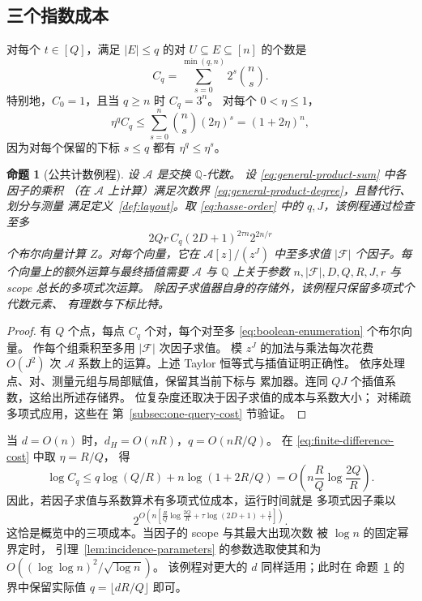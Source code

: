 \documentclass[11pt,reqno]{amsart}
\numberwithin{equation}{section}
\newtheorem{proposition}[theorem]{命题}
\theoremstyle{definition}\newtheorem{definition}[theorem]{定义}
\theoremstyle{remark}\newtheorem{remark}[theorem]{注}
\renewcommand{\le}{\leqslant}
\renewcommand{\ge}{\geqslant}
\begin{document}
\subsection{三个指数成本}
\label{subsec:three-costs}
对每个 $t\in[Q]$，满足 $|E|\le q$ 的对
$U\subseteq E\subseteq[n]$ 的个数是
\begin{equation}\label{eq:pair-count}
 C_q=\sum_{s=0}^{\min(q,n)}2^s\binom ns.
\end{equation}
特别地，$C_0=1$，且当 $q\ge n$ 时 $C_q=3^n$。
对每个 $0<\eta\le1$，
\begin{equation}\label{eq:finite-difference-cost}
 \eta^qC_q\le\sum_{s=0}^n\binom ns(2\eta)^s=(1+2\eta)^n,
\end{equation}
因为对每个保留的下标 $s\le q$ 都有
$\eta^q\le\eta^s$。

\begin{proposition}[公共计数例程]\label{prop:general-count}
设 $\mathcal A$ 是交换 $\mathbb Q$-代数。
设 \eqref{eq:general-product-sum} 中各因子的乘积
（在 $\mathcal A$ 上计算）满足次数界
\eqref{eq:general-product-degree}，且替代行、划分与测量
满足定义~\ref{def:layout}。取 \eqref{eq:hasse-order}
中的 $q,J$，该例程通过检查至多
\[
 2Qr\,C_q(2D+1)^{2\tau n}2^{2n/r}
\]
个布尔向量计算 $Z$。对每个向量，它在
$\mathcal A[z]/(z^J)$ 中至多求值 $|\mathcal F|$
个因子。每个向量上的额外运算与最终插值需要
$\mathcal A$ 与 $\mathbb Q$ 上关于参数
$n,|\mathcal F|,D,Q,R,J,r$ 与 scope 总长的多项式次运算。
除因子求值器自身的存储外，该例程只保留多项式个代数元素、
有理数与下标比特。
\end{proposition}
\begin{proof}
有 $Q$ 个点，每点 $C_q$ 个对，每个对至多
\eqref{eq:boolean-enumeration} 个布尔向量。
作每个组乘积至多用 $|\mathcal F|$ 次因子求值。
模 $z^J$ 的加法与乘法每次花费 $O(J^2)$ 次 $\mathcal A$
系数上的运算。上述 Taylor 恒等式与插值证明正确性。
依序处理点、对、测量元组与局部赋值，保留其当前下标与
累加器。连同 $QJ$ 个插值系数，这给出所述存储界。
位复杂度还取决于因子求值的成本与系数大小；
对稀疏多项式应用，这些在
第~\ref{subsec:one-query-cost} 节验证。
\end{proof}

当 $d=O(n)$ 时，$d_H=O(nR)$，$q=O(nR/Q)$。
在 \eqref{eq:finite-difference-cost} 中取 $\eta=R/Q$，
得
\[
 \log C_q\le q\log(Q/R)+n\log(1+2R/Q)
     =O\!\left(n\frac RQ\log\frac{2Q}{R}\right).
\]
因此，若因子求值与系数算术有多项式位成本，运行时间就是
多项式因子乘以
\begin{equation}\label{eq:three-costs}
 2^{O\left(n\left[
       \frac RQ\log\frac{2Q}{R}
       +\tau\log(2D+1)+\frac1r\right]\right)}.
\end{equation}
这恰是概览中的三项成本。当因子的 scope 与其最大出现次数
被 $\log n$ 的固定幂界定时，
引理~\ref{lem:incidence-parameters} 的参数选取使其和为
$O((\log\log n)^2/\sqrt{\log n})$。
该例程对更大的 $d$ 同样适用；此时在
命题~\ref{prop:general-count} 的界中保留实际值
$q=\lfloor dR/Q\rfloor$ 即可。
\end{document}
